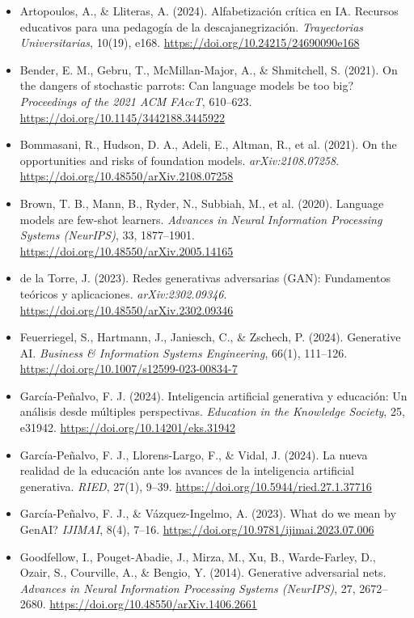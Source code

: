 \begin{itemize}[leftmargin=1.5em, label={}, itemsep=0.45ex, parsep=0pt]
    \item Artopoulos, A., \& Lliteras, A. (2024). Alfabetización crítica en IA. Recursos educativos para una pedagogía de la descajanegrización. \textit{Trayectorias Universitarias}, 10(19), e168. \url{https://doi.org/10.24215/24690090e168}
    \item Bender, E. M., Gebru, T., McMillan-Major, A., \& Shmitchell, S. (2021). On the dangers of stochastic parrots: Can language models be too big? \textit{Proceedings of the 2021 ACM FAccT}, 610--623. \url{https://doi.org/10.1145/3442188.3445922}
    \item Bommasani, R., Hudson, D. A., Adeli, E., Altman, R., et al. (2021). On the opportunities and risks of foundation models. \textit{arXiv:2108.07258}. \url{https://doi.org/10.48550/arXiv.2108.07258}
    \item Brown, T. B., Mann, B., Ryder, N., Subbiah, M., et al. (2020). Language models are few-shot learners. \textit{Advances in Neural Information Processing Systems (NeurIPS)}, 33, 1877--1901. \url{https://doi.org/10.48550/arXiv.2005.14165}
    \item de la Torre, J. (2023). Redes generativas adversarias (GAN): Fundamentos teóricos y aplicaciones. \textit{arXiv:2302.09346}. \url{https://doi.org/10.48550/arXiv.2302.09346}
    \item Feuerriegel, S., Hartmann, J., Janiesch, C., \& Zschech, P. (2024). Generative AI. \textit{Business \& Information Systems Engineering}, 66(1), 111--126. \url{https://doi.org/10.1007/s12599-023-00834-7}
    \item García-Peñalvo, F. J. (2024). Inteligencia artificial generativa y educación: Un análisis desde múltiples perspectivas. \textit{Education in the Knowledge Society}, 25, e31942. \url{https://doi.org/10.14201/eks.31942}
    \item García-Peñalvo, F. J., Llorens-Largo, F., \& Vidal, J. (2024). La nueva realidad de la educación ante los avances de la inteligencia artificial generativa. \textit{RIED}, 27(1), 9--39. \url{https://doi.org/10.5944/ried.27.1.37716}
    \item García-Peñalvo, F. J., \& Vázquez-Ingelmo, A. (2023). What do we mean by GenAI? \textit{IJIMAI}, 8(4), 7--16. \url{https://doi.org/10.9781/ijimai.2023.07.006}
    \item Goodfellow, I., Pouget-Abadie, J., Mirza, M., Xu, B., Warde-Farley, D., Ozair, S., Courville, A., \& Bengio, Y. (2014). Generative adversarial nets. \textit{Advances in Neural Information Processing Systems (NeurIPS)}, 27, 2672--2680. \url{https://doi.org/10.48550/arXiv.1406.2661}

\end{itemize}
